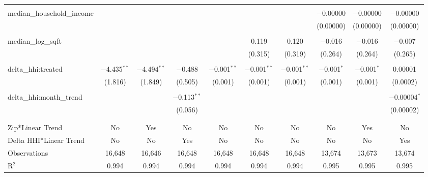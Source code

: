 \begin{table}[H]
{\begin{tabular}{@{\extracolsep{5pt}}lccccccccc}
   & & & & & & & & & \\  

  median\_household\_income &  &  &  &  &  &  & $-$0.00000 & $-$0.00000 & $-$0.00000 \\  

   &  &  &  &  &  &  & (0.00000) & (0.00000) & (0.00000) \\  

   & & & & & & & & & \\  

  median\_log\_sqft &  &  &  &  & 0.119 & 0.120 & $-$0.016 & $-$0.016 & $-$0.007 \\  

   &  &  &  &  & (0.315) & (0.319) & (0.264) & (0.264) & (0.265) \\  

   & & & & & & & & & \\  

  delta\_hhi:treated & $-$4.435$^{**}$ & $-$4.494$^{**}$ & $-$0.488 & $-$0.001$^{**}$ & $-$0.001$^{**}$ & $-$0.001$^{**}$ & $-$0.001$^{*}$ & $-$0.001$^{*}$ & 0.00001 \\  

   & (1.816) & (1.849) & (0.505) & (0.001) & (0.001) & (0.001) & (0.001) & (0.001) & (0.0002) \\  

   & & & & & & & & & \\  

  delta\_hhi:month\_trend &  &  & $-$0.113$^{**}$ &  &  &  &  &  & $-$0.00004$^{*}$ \\  

   &  &  & (0.056) &  &  &  &  &  & (0.00002) \\  

   & & & & & & & & & \\  

 \hline \\[-1.8ex]  

 Zip*Linear Trend & No & Yes & No & No & No & No & No & Yes & No \\  

 Delta HHI*Linear Trend & No & No & Yes & No & No & No & No & No & Yes \\  

 Observations & 16,648 & 16,646 & 16,648 & 16,648 & 16,648 & 16,648 & 13,674 & 13,673 & 13,674 \\  

 R$^{2}$ & 0.994 & 0.994 & 0.994 & 0.994 & 0.994 & 0.994 & 0.995 & 0.995 & 0.995 \\  


\end{tabular}}
\end{table}
